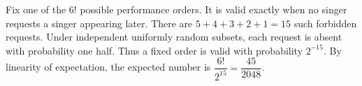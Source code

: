 Fix one of the $6!$ possible performance orders. It is valid exactly when no singer requests a singer appearing later. There are $5+4+3+2+1=15$ such forbidden requests. Under independent uniformly random subsets, each request is absent with probability one half. Thus a fixed order is valid with probability $2^{-15}$. By linearity of expectation, the expected number is $\dfrac{6!}{2^{15}}=\boxed{\dfrac{45}{2048}}$.
